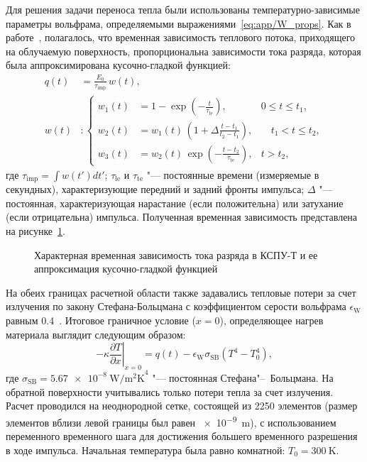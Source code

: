 Для решения задачи переноса тепла были использованы температурно-зависимые параметры вольфрама, определяемыми выражениями~\cref{eq:app/W_props}. Как в работе~\cite{Poskakalov2020}, полагалось, что временная зависимость теплового потока, приходящего на облучаемую поверхность, пропорциональна зависимости тока разряда, которая была аппроксимирована кусочно-гладкой функцией:
\begin{subequations}
	\label{eq:ch3/pulse_form}
	\begin{align}
		q(t) & =\frac{E_0}{\tau_\mathrm{imp}} \, w(t), \\
		w(t) & : \left\{
		\begin{alignedat}{2}
			w_1(t) & = 1 - \exp \left( -\frac{t}{\tau_\mathrm{le}} \right), & 0 \leq t \leq t_1, \\
			w_2(t) & = w_1(t) \, \left( 1 + \Delta \frac{t-t_1}{t_2 - t_1} \right), & \quad t_1 < t \leq t_2, \\
			w_3(t) & = w_2(t) \, \exp \left( -\frac{t-t_2}{\tau_\mathrm{te}} \right), & t > t_2,
		\end{alignedat}
		\right.
	\end{align}
\end{subequations}
где \( \tau_\mathrm{imp}=\int w(t')dt' \);  \( \tau_\mathrm{le}\) и \( \tau_\mathrm{te}\) "--- постоянные времени (измеряемые в секундных), характеризующие передний и задний фронты импульса; \( \Delta \) "--- постоянная, характеризующая нарастание (если положительна) или затухание (если отрицательна) импульса. Полученная временная зависимость представлена на рисунке~\cref{fig:ch3/QSPA_pulse}.
\begin{figure}[ht]
	\caption{Характерная временная зависимость тока разряда в КСПУ-Т и ее аппроксимация кусочно-гладкой функцией}\label{fig:ch3/QSPA_pulse}
\end{figure}
На обеих границах расчетной области также задавались тепловые потери за счет излучения по закону Стефана-Больцмана с коэффициентом серости вольфрама \( \epsilon_\mathrm{W} \) равным \num{0.4}~\cite{weast1975crc}. Итоговое граничное условие (\( x=0 \)), определяющее нагрев материала выглядит следующим образом:
\begin{equation}
	-\kappa \left. \frac{\partial T}{\partial x} \right\vert_{x=0} = q(t) - \epsilon_\mathrm{W} \sigma_\mathrm{SB} (T^4-T_0^4),
\end{equation}
где \( \sigma_\mathrm{SB} = \SI{5.67e-8}{\watt\per\meter\squared\kelvin}^{4} \) "--- постоянная Стефана"--~Больцмана. На обратной поверхности учитывались только потери тепла за счет излучения. Расчет проводился на неоднородной сетке, состоящей из \num{2250} элементов (размер элементов вблизи левой границы был равен \SI{e-9}{\meter}), с использованием переменного временного шага для достижения большего временного разрешения в ходе импульса. Начальная температура была равно комнатной: \( T_0 = \SI{300}{\kelvin} \).

